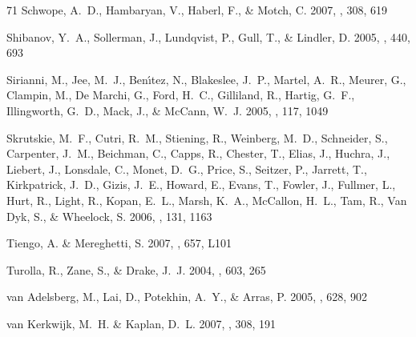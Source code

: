 \documentclass[iop]{emulateapj}
\begin{document}
\begin{thebibliography}{71}
{Schwope}, A.~D., {Hambaryan}, V., {Haberl}, F., \& {Motch}, C. 2007, \apss,
  308, 619

{Shibanov}, Y.~A., {Sollerman}, J., {Lundqvist}, P., {Gull}, T., \& {Lindler},
  D. 2005, \aap, 440, 693

{Sirianni}, M., {Jee}, M.~J., {Ben{\'{\i}}tez}, N., {Blakeslee}, J.~P.,
  {Martel}, A.~R., {Meurer}, G., {Clampin}, M., {De Marchi}, G., {Ford}, H.~C.,
  {Gilliland}, R., {Hartig}, G.~F., {Illingworth}, G.~D., {Mack}, J., \&
  {McCann}, W.~J. 2005, \pasp, 117, 1049

{Skrutskie}, M.~F., {Cutri}, R.~M., {Stiening}, R., {Weinberg}, M.~D.,
  {Schneider}, S., {Carpenter}, J.~M., {Beichman}, C., {Capps}, R., {Chester},
  T., {Elias}, J., {Huchra}, J., {Liebert}, J., {Lonsdale}, C., {Monet}, D.~G.,
  {Price}, S., {Seitzer}, P., {Jarrett}, T., {Kirkpatrick}, J.~D., {Gizis},
  J.~E., {Howard}, E., {Evans}, T., {Fowler}, J., {Fullmer}, L., {Hurt}, R.,
  {Light}, R., {Kopan}, E.~L., {Marsh}, K.~A., {McCallon}, H.~L., {Tam}, R.,
  {Van Dyk}, S., \& {Wheelock}, S. 2006, \aj, 131, 1163

{Tiengo}, A. \& {Mereghetti}, S. 2007, \apjl, 657, L101

{Turolla}, R., {Zane}, S., \& {Drake}, J.~J. 2004, \apj, 603, 265

{van Adelsberg}, M., {Lai}, D., {Potekhin}, A.~Y., \& {Arras}, P. 2005, \apj,
  628, 902

{van Kerkwijk}, M.~H. \& {Kaplan}, D.~L. 2007, \apss, 308, 191


\end{thebibliography}
\end{document}
